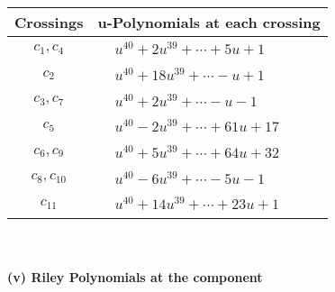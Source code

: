 \documentclass[1p]{elsarticle_modified}
\theoremstyle{definition}
\begin{document}
\begin{tabular}{m{50pt}|m{274pt}}
Crossings & \hspace{64pt}u-Polynomials at each crossing \\
\hline $$\begin{aligned}c_{1},c_{4}\end{aligned}$$&$\begin{aligned}
&u^{40}+2 u^{39}+\cdots+5 u+1
\end{aligned}$\\
\hline $$\begin{aligned}c_{2}\end{aligned}$$&$\begin{aligned}
&u^{40}+18 u^{39}+\cdots- u+1
\end{aligned}$\\
\hline $$\begin{aligned}c_{3},c_{7}\end{aligned}$$&$\begin{aligned}
&u^{40}+2 u^{39}+\cdots- u-1
\end{aligned}$\\
\hline $$\begin{aligned}c_{5}\end{aligned}$$&$\begin{aligned}
&u^{40}-2 u^{39}+\cdots+61 u+17
\end{aligned}$\\
\hline $$\begin{aligned}c_{6},c_{9}\end{aligned}$$&$\begin{aligned}
&u^{40}+5 u^{39}+\cdots+64 u+32
\end{aligned}$\\
\hline $$\begin{aligned}c_{8},c_{10}\end{aligned}$$&$\begin{aligned}
&u^{40}-6 u^{39}+\cdots-5 u-1
\end{aligned}$\\
\hline $$\begin{aligned}c_{11}\end{aligned}$$&$\begin{aligned}
&u^{40}+14 u^{39}+\cdots+23 u+1
\end{aligned}$\\
\hline
\end{tabular}\\~\\
\newpage\renewcommand{\arraystretch}{1}
\flushleft \textbf{(v) Riley Polynomials at the component}\newline \\
\end{document}

